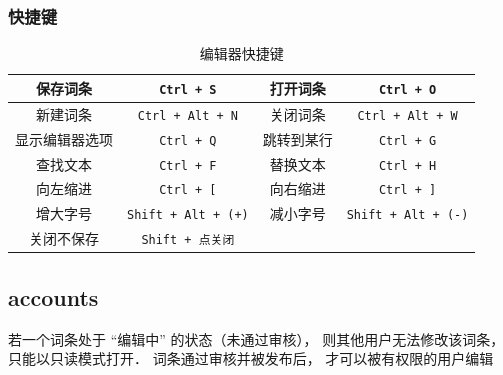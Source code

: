 \subsubsection{快捷键}

\begin{table}[ht]
\centering
\caption{编辑器快捷键}\label{editor_tab1}
\begin{tabular}{|c|c|c|c|}
\hline
保存词条 & \lstinline|Ctrl + S| & 打开词条 & \lstinline|Ctrl + O| \\
\hline
新建词条 & \lstinline|Ctrl + Alt + N| & 关闭词条 & \lstinline|Ctrl + Alt + W| \\
\hline
显示编辑器选项 & \lstinline|Ctrl + Q| & 跳转到某行 & \lstinline|Ctrl + G| \\
\hline
查找文本 & \lstinline|Ctrl + F| & 替换文本 & \lstinline|Ctrl + H| \\
\hline
向左缩进 & \lstinline|Ctrl + [| & 向右缩进 & \lstinline|Ctrl + ]| \\
\hline
增大字号 & \lstinline|Shift + Alt + (+)| & 减小字号 & \lstinline|Shift + Alt + (-)| \\
\hline
关闭不保存 & \lstinline|Shift + 点关闭| &  &  \\
\hline
\end{tabular}
\end{table}

\subsection{accounts}

若一个词条处于 “编辑中” 的状态（未通过审核）， 则其他用户无法修改该词条， 只能以只读模式打开． 词条通过审核并被发布后， 才可以被有权限的用户编辑
